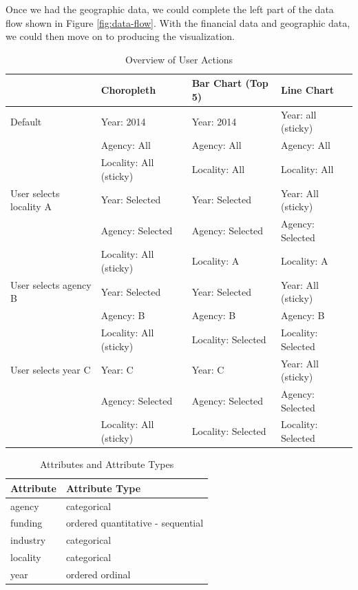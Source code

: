 \documentclass[10pt,journal,compsoc]{IEEEtran}
\begin{document}
Once we had the geographic data, we could complete the left part of the data flow shown in Figure \ref{fig:data-flow}.  With the financial data and geographic data, we could then move on to producing the visualization.

\begin{table}[t]
\centering
\caption{Overview of User Actions}
\label{tab:user-actions}
\begin{tabular}{l | l | l | l}
\textbf{} & \textbf{Choropleth} & \textbf{Bar Chart (Top 5)} & \textbf{Line Chart}\\
\hline
Default & Year: 2014 & Year: 2014 & Year: all (sticky)\\
 & Agency: All & Agency: All & Agency: All\\
 & Locality: All (sticky) & Locality: All & Locality: All\\
\hline
User selects locality A & Year: Selected & Year: Selected & Year: All (sticky) \\
 & Agency: Selected & Agency: Selected & Agency: Selected\\
 & Locality: All (sticky) & Locality: A & Locality: A\\
\hline
User selects agency B & Year: Selected & Year: Selected & Year: All (sticky) \\
 & Agency: B & Agency: B & Agency: B\\
 & Locality: All (sticky) & Locality: Selected & Locality: Selected\\
\hline
User selects year C & Year: C & Year: C & Year: All (sticky) \\
& Agency: Selected & Agency: Selected & Agency: Selected\\
& Locality: All (sticky) & Locality: Selected & Locality: Selected\\
\hline
\end{tabular}
\end{table}

\begin{table}[t]
\centering
\caption{Attributes and Attribute Types}
\label{tab:attribute-type}
\begin{tabular}{l | l}
\textbf{Attribute} & \textbf{Attribute Type} \\
\hline
agency & categorical\\
\hline
funding & ordered quantitative - sequential \\
\hline
industry & categorical \\
\hline
locality & categorical \\
\hline
year & ordered ordinal \\
\hline
\end{tabular}
\end{table} 
\end{document}
